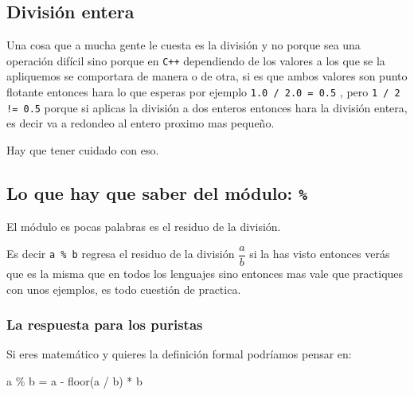 \documentclass[12pt, fleqn]{report}                             %
\def \Eq {equation}                                             %
\newenvironment{MultiLineEquation*}[1]                          %
        {\begin{\Eq*}\begin{alignedat}{#1}}                         %
        {\end{alignedat}\end{\Eq*}}                                 %
\theoremstyle{break}                                            %
\newcommand{\textCode}[1]  { \texttt{#1} }                      %
\newcommand \Cpp  {\textCode{C++} }                               %
\begin{document}
            \subsection{División entera}

                Una cosa que a mucha gente le cuesta es la división y no porque
                sea una operación difícil sino porque en \Cpp dependiendo de los
                valores a los que se la apliquemos se comportara de manera o de otra,
                si es que ambos valores son punto flotante entonces hara lo que esperas
                por ejemplo \textCode{1.0 / 2.0 = 0.5}, pero \textCode{1 / 2 != 0.5} porque
                si aplicas la división a dos enteros entonces hara la división entera, es decir
                va a redondeo al entero proximo mas pequeño.

                Hay que tener cuidado con eso.

            \subsection{Lo que hay que saber del módulo: \textCode{\%}}
            
                El módulo es pocas palabras es el residuo de la división.

                Es decir \textCode{a \% b} regresa el residuo de la división $\dfrac{a}{b}$
                si la has visto entonces verás que es la misma que en todos los lenguajes
                sino entonces mas vale que practiques con unos ejemplos, es todo cuestión
                de practica.

                \subsubsection{La respuesta para los puristas}

                    Si eres matemático y quieres la definición formal podríamos pensar en:

                    \begin{MultiLineEquation*}{3}
                        a \% b = a - floor(a / b) \; * \; b
                    \end{MultiLineEquation*}
\end{document}
